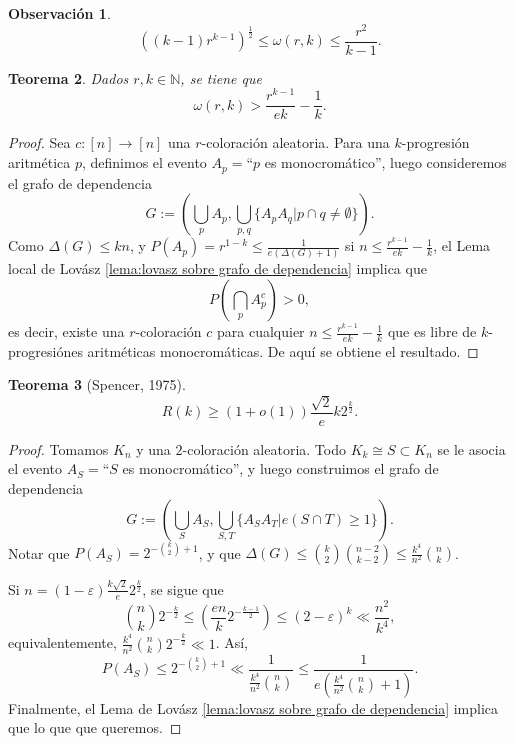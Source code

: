 \documentclass[12pt]{report}
\theoremstyle{plain}
\newtheorem{theorem}{Teorema}[section]
\theoremstyle{definition}
\newtheorem{obs}[theorem]{Observación}
\newcommand{\naturals}{\mathbb{N}}
\begin{document}
\begin{obs}
\[
    \left ( (k-1) r^{k-1} \right )^{\frac 1 2} \leq \omega (r,k) \leq \frac{r^2}{k-1}.
\]
\end{obs}

\begin{theorem}
Dados $r,k \in \naturals$, se tiene que
\[
    \omega (r,k) > \frac{r^{k-1}}{e k} - \frac 1 k.
\]
\end{theorem}
\begin{proof}
Sea $c : [n] \to [n]$ una $r$-coloración aleatoria. Para una $k$-progresión aritmética $p$, definimos el evento $A_p = $``$p$ es monocromático'', luego consideremos el grafo de dependencia
\[
    G := \left ( \bigcup_{p} A_p , \bigcup_{p, q} \{A_p A_q | p \cap q \neq \emptyset\} \right ).
\]
Como $\Delta (G) \leq kn$, y $P(A_p) = r^{1-k} \leq \frac{1}{e (\Delta (G) +1)}$ si $n \leq \frac{r^{k-1}}{e k} - \frac 1 k$, el Lema local de Lovász \ref{lema:lovasz sobre grafo de dependencia} implica que
\[
    P(\bigcap_{p} A_p^c) > 0,
\]
es decir, existe una $r$-coloración $c$ para cualquier $n \leq \frac{r^{k-1}}{e k} - \frac 1 k$ que es libre de $k$-progresiónes aritméticas monocromáticas. De aquí se obtiene el resultado.
\end{proof}

\begin{theorem}[Spencer, 1975]
\[
    R(k) \geq (1 + o(1)) \frac{\sqrt 2}{e} k 2^{\frac k 2}.
\]

\end{theorem}
\begin{proof}
Tomamos $K_n$ y una $2$-coloración aleatoria. Todo $K_k \cong S \subset K_n$ se le asocia el evento $A_S = $``$S$ es monocromático'', y luego construimos el grafo de dependencia
\[
    G:= \left ( \bigcup_S A_S, \bigcup_{S,T} \{A_S A_T | e(S \cap  T) \geq 1\} \right ).
\]
Notar que $P(A_S) = 2^{- \binom k 2 + 1}$, y que $\Delta (G) \leq \binom k 2 \binom{n-2}{k-2} \leq \frac{k^4}{n^2}\binom n k$.

Si $n = (1 - \varepsilon) \frac{k \sqrt 2}{e} 2^{\frac k 2}$, se sigue que
\[
    \binom n k 2^{- \frac k 2} \leq \left ( \frac{e n}{k} 2^{- \frac {k-1}2} \right ) \leq (2- \varepsilon)^k \ll \frac{n^2}{k^4},
\]
equivalentemente, $\frac{k^4}{n^2} \binom n k 2^{- \frac k 2} \ll 1$.
Así,
\[
    P(A_S) \leq 2^{- \binom k 2 + 1} \ll \frac{1}{\frac{k^4}{n^2} \binom n k} \leq \frac{1}{e \left ( \frac{k^4}{n^2} \binom n k +  1 \right )}.
\]
Finalmente, el Lema de Lovász \ref{lema:lovasz sobre grafo de dependencia} implica que lo que que queremos.
\end{proof}
\end{document}
